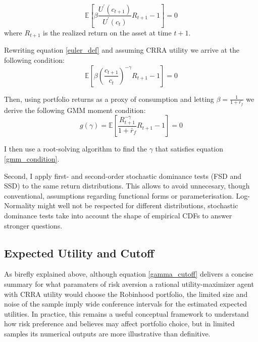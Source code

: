 \begin{equation}
    \mathbb{E}\left[ \beta \frac{U^\prime(c_{t+1})}{U^\prime(c_{t})}R_{t+1} - 1\right] = 0
    \label{euler_def}
\end{equation}  
where $R_{t+1}$ is the realized return on the asset at time $t+1$.

Rewriting equation \ref{euler_def} and assuming CRRA utility we arrive at the following condition:
\begin{equation}
    \mathbb{E}\left[ \beta \left( \frac{c_{t+1}}{c_{t}} \right)^{-\gamma} R_{t+1} - 1\right] = 0
\end{equation}  

Then, using portfolio returns as a proxy of consumption and letting $\beta = \frac{1}{1+\bar{r_f}}$ we derive the following GMM moment condition:
\begin{equation}
    g(\gamma) = \mathbb{E} \left[ \frac{R_{t+1}^{-\gamma}}{1+\bar{r}_f}  R_{t+1} - 1\right] = 0
    \label{gmm_condition}
\end{equation}  

I then use a root-solving algorithm to find the $\gamma$ that satisfies equation \ref{gmm_condition}. 



Second, I apply first- and second-order stochastic dominance tests (FSD and SSD) to the same return distributions.
This allows to avoid unnecesary, though conventional, assumptions regarding functional forms or parameterisation.
Log-Normality might well not be respected for different distributions, stochastic dominance tests take into account the shape of empirical CDFs to answer stronger questions. 

\subsection{Expected Utility and Cutoff}
As birefly explained above, although equation \ref{gamma_cutoff} delivers a concise summary for what paramaters of risk aversion a rational utility-maximizer agent with CRRA utility would choose the Robinhood portfolio,
the limited size and noise of the sample imply wide conference intervals for the estimated expected utilities.
In practice, this remains a useful conceptual framework to understand how risk preference and believes may affect portfolio choice, but in limited samples its numerical outputs are more illustrative than definitive.
